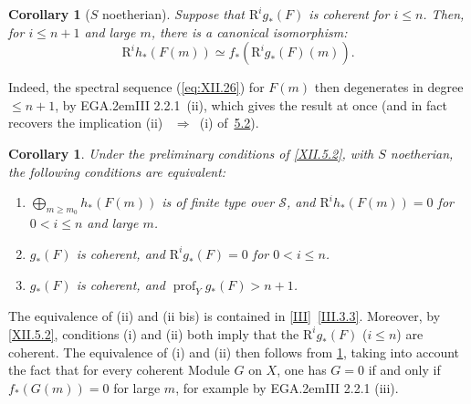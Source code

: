\documentclass[11pt,a4paper,oneside]{book}
\providecommand{\sisi}[2]{#2}
\providecommand{\EGA}{\textup{EGA}\kern.2em}
\providecommand{\Ss}{\mathcal S}
\providecommand{\prof}{\operatorname{prof}}
\providecommand{\R}{\mathrm R}
\providecommand{\ALORS}{\unskip~$\Longrightarrow$~\ignorespaces}
\newenvironment{enumeratei}
  {\begin{enumerate}[label=(\roman*)]}
  {\end{enumerate}}
\theoremstyle{plain}
\newtheorem{corollaire}[subsection]{Corollary}
\theoremstyle{definition}
\theoremstyle{remark}
\renewcommand{\Ref}[1]{\textup{\ref{#1}}}
\begin{document}
\begin{corollaire}[{{\normalfont$S$ noetherian}}] \label{XII.5.4}
Suppose that $\R^ig_\ast(F)$ is coherent for $i\leq n$. Then, for $i\leq n+1$ and large $m$, there is a canonical isomorphism:
\[
\R^ih_\ast(F(m)) \simeq f_\ast(\R^ig_\ast(\sisi{G}{F})(m)).
\]
\end{corollaire}

Indeed, the spectral sequence (\Ref{eq:XII.26}) for $F(m)$ then degenerates in degree $\leq \sisi{n}{n+1}$, by \EGA III 2.2.1~(ii), which gives the result at once (and in fact recovers the implication (ii) \ALORS (i) of~\hyperref[XII.5.2]{5.2}).

\enlargethispage{1.2\baselineskip}%
\begin{corollaire} \label{XII.5.5}
Under the preliminary conditions of \Ref{XII.5.2}, with $S$ noetherian, the following conditions are equivalent:
\begin{enumeratei}
\item
$\sisi{\coprod}{\bigoplus}_{m\geq m_0}h_\ast(F(m)\sisi{}{)}$ is of finite type over $\sisi{S}{\Ss}$, and $\R^ih_\ast(F(m))=0$ for $0<i\leq n$ and large $m$.
\item
$g_\ast(F)$ is coherent, and $\R^ig_\ast(F)=0$ for $0<i\leq n$.
\item[\textup{(ii bis)}] $g_\ast(F)$ is coherent, and $\prof_Y g_\ast(F)>n+1$.
\end{enumeratei}
\end{corollaire}

The equivalence of (ii) and (ii bis) is contained in \Ref{III}~\Ref{III.3.3}. Moreover, by \Ref{XII.5.2}, conditions (i) and (ii) both imply that the $\R^ig_\ast(F)$ ($i\leq n$) are coherent. The equivalence of (i) and (ii) then follows from \Ref{XII.5.4}, taking into account the fact that for every coherent Module $G$ on $X$, one has $G=0$ if and only if $f_\ast(G(m))=0$ for large $m$, for example by \EGA III 2.2.1 (iii).
\end{document}
